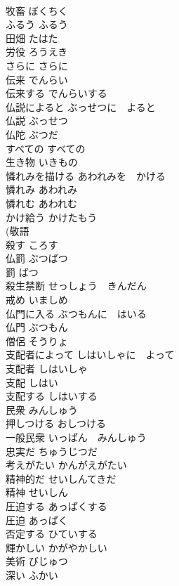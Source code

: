 \documentclass[8pt]{extreport}
\begin{document}
\begin{CJK}{UTF8}{min}
\\	牧畜	ぼくちく	
\\	ふるう	ふるう	
\\	田畑	たはた	
\\	労役	ろうえき	
\\	さらに	さらに	
\\	伝来	でんらい	
\\	伝来する	でんらいする	
\\	仏説によると	ぶっせつに　よると	
\\	仏説	ぶっせつ	
\\	仏陀	ぶつだ	
\\	すべての	すべての	
\\	生き物	いきもの	
\\	憐れみを描ける	あわれみを　かける	
\\	憐れみ	あわれみ	
\\	憐れむ	あわれむ	
\\	かけ給う	かけたもう	
\\	(敬語 
\\	殺す	ころす	
\\	仏罰	ぶつばつ	
\\	罰	ばつ	
\\	殺生禁断	せっしょう　きんだん	
\\	戒め	いましめ	
\\	仏門に入る	ぶつもんに　はいる	
\\	仏門	ぶつもん	
\\	僧侶	そうりょ	
\\	支配者によって	しはいしゃに　よって	
\\	支配者	しはいしゃ	
\\	支配	しはい	
\\	支配する	しはいする	
\\	民衆	みんしゅう	
\\	押しつける	おしつける	
\\	一般民衆	いっぱん　みんしゅう	
\\	忠実だ	ちゅうじつだ	
\\	考えがたい	かんがえがたい	
\\	精神的だ	せいしんてきだ	
\\	精神	せいしん	
\\	圧迫する	あっぱくする	
\\	圧迫	あっぱく	
\\	否定する	ひていする	
\\	輝かしい	かがやかしい	
\\	美術	びじゅつ	
\\	深い	ふかい	

\end{CJK}
\end{document}
